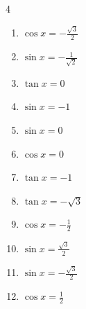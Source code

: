 \begin{multicols}{4}
\begin{enumerate}
  \item $\displaystyle \cos{x}  = -\frac{\sqrt{3}}{2}$


  \item $\displaystyle \sin{x}  = -\frac{1}{\sqrt{2}}$


  \item $\displaystyle \tan{x}  = 0$


\columnbreak %

  \item $\displaystyle \sin{x}  = -1$


  \item $\displaystyle \sin{x}  = 0$


  \item $\displaystyle \cos{x}  = 0$


  \item $\displaystyle \tan{x}  = -1$


  \item $\displaystyle \tan{x}  = -\sqrt{3}$


  \item $\displaystyle \cos{x}  = -\frac{1}{2}$


  \item $\displaystyle \sin{x}  = \frac{\sqrt{3}}{2}$


  \item $\displaystyle \sin{x}  = -\frac{\sqrt{3}}{2}$


  \item $\displaystyle \cos{x}  = \frac{1}{2}$


\end{enumerate}
\end{multicols}
